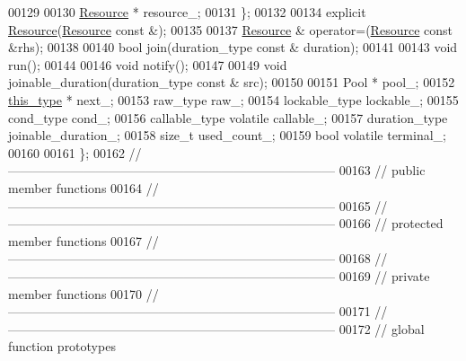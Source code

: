 \begin{DoxyCode}
00129 
00130         \hyperlink{classhryky_1_1thread_1_1_resource_a1e7dce4836c5ff80cf23a14088bdb37a}{Resource} * resource\_;
00131     \};
00132 
00134     \textcolor{keyword}{explicit} \hyperlink{classhryky_1_1thread_1_1_resource_a1e7dce4836c5ff80cf23a14088bdb37a}{Resource}(\hyperlink{classhryky_1_1thread_1_1_resource_a1e7dce4836c5ff80cf23a14088bdb37a}{Resource} \textcolor{keyword}{const} &);
00135 
00137     \hyperlink{classhryky_1_1thread_1_1_resource_a1e7dce4836c5ff80cf23a14088bdb37a}{Resource} & operator=(\hyperlink{classhryky_1_1thread_1_1_resource_a1e7dce4836c5ff80cf23a14088bdb37a}{Resource} \textcolor{keyword}{const} &rhs);
00138     
00140     \textcolor{keywordtype}{bool} join(duration\_type \textcolor{keyword}{const} & duration);
00141 
00143     \textcolor{keywordtype}{void} run();
00144 
00146     \textcolor{keywordtype}{void} notify();
00147 
00149     \textcolor{keywordtype}{void} joinable\_duration(duration\_type \textcolor{keyword}{const} & src);
00150 
00151     Pool *                      pool\_;
00152     \hyperlink{classhryky_1_1thread_1_1_resource_a35e0b5a88467f7f16afece383f7569b3}{this_type} *                 next\_;
00153     raw\_type                    raw\_;
00154     lockable\_type               lockable\_;
00155     cond\_type                   cond\_;
00156     callable\_type \textcolor{keyword}{volatile}      callable\_;
00157     duration\_type               joinable\_duration\_;
00158     \textcolor{keywordtype}{size\_t}                      used\_count\_;
00159     \textcolor{keywordtype}{bool} \textcolor{keyword}{volatile}               terminal\_;
00160 
00161 \};
00162 \textcolor{comment}{//
      ------------------------------------------------------------------------------}
00163 \textcolor{comment}{// public member functions}
00164 \textcolor{comment}{//
      ------------------------------------------------------------------------------}
00165 \textcolor{comment}{//
      ------------------------------------------------------------------------------}
00166 \textcolor{comment}{// protected member functions}
00167 \textcolor{comment}{//
      ------------------------------------------------------------------------------}
00168 \textcolor{comment}{//
      ------------------------------------------------------------------------------}
00169 \textcolor{comment}{// private member functions}
00170 \textcolor{comment}{//
      ------------------------------------------------------------------------------}
00171 \textcolor{comment}{//
      ------------------------------------------------------------------------------}
00172 \textcolor{comment}{// global function prototypes}

\end{DoxyCode}
